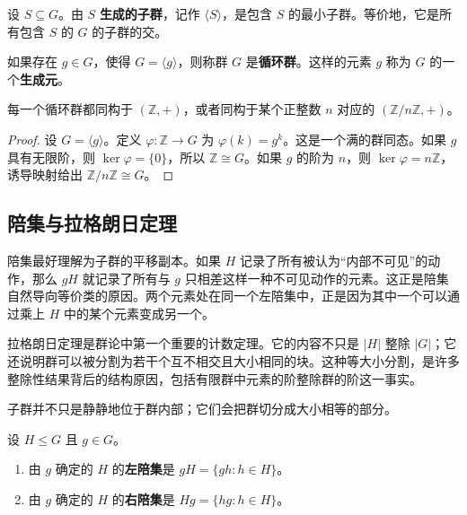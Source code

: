 \begin{definition}[生成子群]
设 $S\subseteq G$。由 $S$ \textbf{生成的子群}，记作 $\langle S\rangle$，是包含 $S$ 的最小子群。等价地，它是所有包含 $S$ 的 $G$ 的子群的交。
\end{definition}

\begin{definition}[循环群]
如果存在 $g\in G$，使得 $G=\langle g\rangle$，则称群 $G$ 是\textbf{循环群}。这样的元素 $g$ 称为 $G$ 的一个\textbf{生成元}。
\end{definition}

\begin{theorem}[循环群的分类]
每一个循环群都同构于 $(\mathbb{Z},+)$，或者同构于某个正整数 $n$ 对应的 $(\mathbb{Z}/n\mathbb{Z},+)$。
\end{theorem}

\begin{proof}
设 $G=\langle g\rangle$。定义 $\varphi:\mathbb{Z}\to G$ 为 $\varphi(k)=g^k$。这是一个满的群同态。如果 $g$ 具有无限阶，则 $\ker\varphi=\{0\}$，所以 $\mathbb{Z}\cong G$。如果 $g$ 的阶为 $n$，则 $\ker\varphi=n\mathbb{Z}$，诱导映射给出 $\mathbb{Z}/n\mathbb{Z}\cong G$。
\end{proof}

\subsection{陪集与拉格朗日定理}


陪集最好理解为子群的平移副本。如果 $H$ 记录了所有被认为“内部不可见”的动作，那么 $gH$ 就记录了所有与 $g$ 只相差这样一种不可见动作的元素。这正是陪集自然导向等价类的原因。两个元素处在同一个左陪集中，正是因为其中一个可以通过乘上 $H$ 中的某个元素变成另一个。

拉格朗日定理是群论中第一个重要的计数定理。它的内容不只是 $|H|$ 整除 $|G|$；它还说明群可以被分割为若干个互不相交且大小相同的块。这种等大小分割，是许多整除性结果背后的结构原因，包括有限群中元素的阶整除群的阶这一事实。

子群并不只是静静地位于群内部；它们会把群切分成大小相等的部分。

\begin{definition}[陪集]
设 $H\leq G$ 且 $g\in G$。
\begin{enumerate}
    \item 由 $g$ 确定的 $H$ 的\textbf{左陪集}是 $gH=\{gh:h\in H\}$。
    \item 由 $g$ 确定的 $H$ 的\textbf{右陪集}是 $Hg=\{hg:h\in H\}$。
\end{enumerate}
\end{definition}

